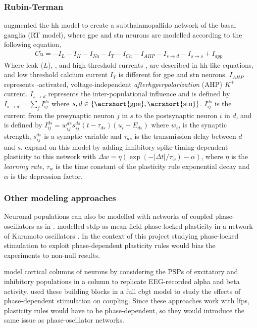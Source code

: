 \subsubsection{Rubin-Terman}
\cite{terman2002activity} augmented the \acrshort{hh} model to create a subthalamopallido network of the
basal ganglia (RT model), where \acrshort{gpe} and \acrshort{stn} neurons are modelled according to the following equation,
\begin{align}
	C \dot u = - I_L - I_K - I_{Na} - I_T - I_{Ca} - I_{AHP} - I_{s \rightarrow d} -
	I_{s \rightarrow s} + I_{app}
\end{align}
Where leak ($L$), \K, \Na and high-threshold \Ca currents \cite{song2000characterization}, are
described in \acrshort{hh}-like equations, and low threshold calcium current $I_T$ is different for \acrshort{gpe} and
\acrshort{stn} neurons. $I_{AHP}$ represents \Ca-activated, voltage-independent \textit{afterhyperpolarization}
(AHP) $K^+$ current. $I_{s \rightarrow d}$ represents the inter-populational influence and is
defined by
$I_{s \rightarrow d} = \sum_{j} I_{ij}^{ds}$ where $s, d \in \{\text{\acrshort{gpe}}, \text{\acrshort{stn}}\}$.
$I_{ij}^{ds}$ is the current from the presynaptic neuron $j$ in $s$ to the
postsynaptic neuron $i$ in $d$, and is defined by
$I_{ij}^{ds} = w_{ij}^{ds}s_{ij}^{ds}(t - \tau_{ds})(u_i - E_{ds})$ where $w_{ij}$ is the
synaptic strength, $s_{ij}^{ds}$ is a synaptic variable and $\tau_{ds}$ is the transmission
delay between $d$ and $s$.
\cite{madadi2022inhibitory} expand on this model by adding inhibitory spike-timing-dependent
plasticity to this network with $\Delta w = \eta(\exp(-|\Delta t| / \tau_w) - \alpha)$,
where $\eta$ is the \textit{learning rate}, $\tau_w$ is the time constant of the plasticity
rule exponential decay and $\alpha$ is the depression factor.

\subsubsection{Other modeling approaches}
Neuronal populations can also be modelled with networks of coupled phase-oscillators as in
\cite{tass2006long}. \cite{duchet2023mean} modelled \acrshort{stdp} as mean-field phase-locked plasticity in a network of
Kuramoto oscillators \cite{kuramoto1984phase}. In the context of this project studying phase-locked stimulation
to exploit phase-dependent plasticity rules would bias the experiments to non-null results.

\cite{jansen1995electroencephalogram} model cortical columns of neurons by considering the PSPs of
excitatory and inhibitory populations in a column to replicate EEG-recorded alpha and beta activity.
\cite{west2022stimulating} used these building blocks in a full \acrshort{cbgt} model to study the effects of
phase-dependent stimulation on coupling. Since these approaches work with \acrshort{lfp}s, plasticity
rules would have to be phase-dependent, so they would introduce the same issue as phase-oscillator networks.

